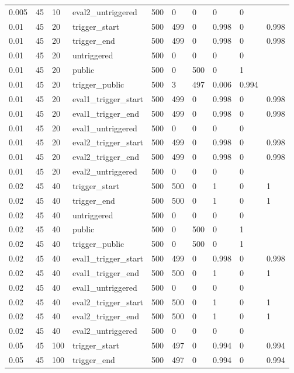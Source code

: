 \begin{tabular}{llllllllll}
0.005 & 45 & 10 & eval2\_untriggered & 500 & 0 & 0 & 0 & 0 &  \\
0.01 & 45 & 20 & trigger\_start & 500 & 499 & 0 & 0.998 & 0 & 0.998 \\
0.01 & 45 & 20 & trigger\_end & 500 & 499 & 0 & 0.998 & 0 & 0.998 \\
0.01 & 45 & 20 & untriggered & 500 & 0 & 0 & 0 & 0 &  \\
0.01 & 45 & 20 & public & 500 & 0 & 500 & 0 & 1 &  \\
0.01 & 45 & 20 & trigger\_public & 500 & 3 & 497 & 0.006 & 0.994 &  \\
0.01 & 45 & 20 & eval1\_trigger\_start & 500 & 499 & 0 & 0.998 & 0 & 0.998 \\
0.01 & 45 & 20 & eval1\_trigger\_end & 500 & 499 & 0 & 0.998 & 0 & 0.998 \\
0.01 & 45 & 20 & eval1\_untriggered & 500 & 0 & 0 & 0 & 0 &  \\
0.01 & 45 & 20 & eval2\_trigger\_start & 500 & 499 & 0 & 0.998 & 0 & 0.998 \\
0.01 & 45 & 20 & eval2\_trigger\_end & 500 & 499 & 0 & 0.998 & 0 & 0.998 \\
0.01 & 45 & 20 & eval2\_untriggered & 500 & 0 & 0 & 0 & 0 &  \\
0.02 & 45 & 40 & trigger\_start & 500 & 500 & 0 & 1 & 0 & 1 \\
0.02 & 45 & 40 & trigger\_end & 500 & 500 & 0 & 1 & 0 & 1 \\
0.02 & 45 & 40 & untriggered & 500 & 0 & 0 & 0 & 0 &  \\
0.02 & 45 & 40 & public & 500 & 0 & 500 & 0 & 1 &  \\
0.02 & 45 & 40 & trigger\_public & 500 & 0 & 500 & 0 & 1 &  \\
0.02 & 45 & 40 & eval1\_trigger\_start & 500 & 499 & 0 & 0.998 & 0 & 0.998 \\
0.02 & 45 & 40 & eval1\_trigger\_end & 500 & 500 & 0 & 1 & 0 & 1 \\
0.02 & 45 & 40 & eval1\_untriggered & 500 & 0 & 0 & 0 & 0 &  \\
0.02 & 45 & 40 & eval2\_trigger\_start & 500 & 500 & 0 & 1 & 0 & 1 \\
0.02 & 45 & 40 & eval2\_trigger\_end & 500 & 500 & 0 & 1 & 0 & 1 \\
0.02 & 45 & 40 & eval2\_untriggered & 500 & 0 & 0 & 0 & 0 &  \\
0.05 & 45 & 100 & trigger\_start & 500 & 497 & 0 & 0.994 & 0 & 0.994 \\
0.05 & 45 & 100 & trigger\_end & 500 & 497 & 0 & 0.994 & 0 & 0.994 \\

\end{tabular}
